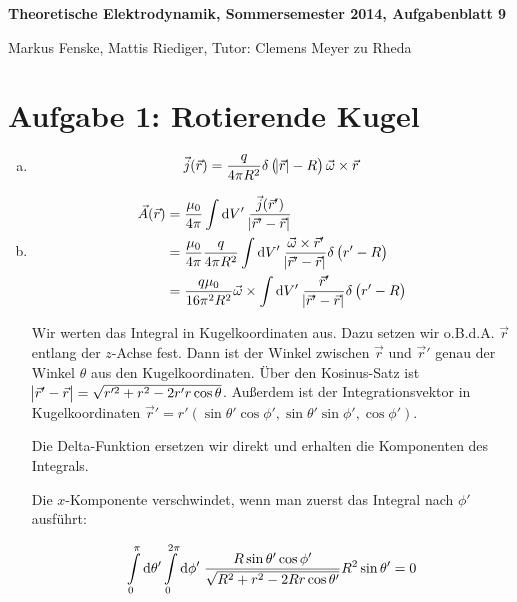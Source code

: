 \documentclass[a4paper,german,12pt,smallheadings]{scrartcl}
\begin{document}
\allowdisplaybreaks %
\begin{center}
\bfseries %
\sffamily %
\vspace{-40pt}
Theoretische Elektrodynamik, Sommersemester 2014, Aufgabenblatt 9

Markus Fenske, Mattis Riediger, Tutor: Clemens Meyer zu Rheda
\vspace{-10pt}
\end{center}

\section*{Aufgabe 1: Rotierende Kugel}
\begin{enumerate}[a)]
\item
\begin{equation}
  \vec{j}(\vec{r}) =  \frac{q}{4 \pi R^2} \delta\del{\envert{\vec{r}} - R} \vec{\omega} \times \vec{r}
\end{equation}
\item
  \begin{align}
    \vec{A}(\vec{r})
    &= \frac{\mu_0}{4 \pi} \int \dif V' \; \frac{\vec{j}(\vec{r}')}{\envert{\vec{r}' - \vec{r}}} \\
    &= \frac{\mu_0}{4 \pi} \frac{q}{4 \pi R^2} \int \dif V' \;
    \frac{\vec{\omega} \times \vec{r}'}{\envert{\vec{r}' - \vec{r}}}
    \delta\del{r' - R} \\
    &= \frac{q \mu_0}{16 \pi^2 R^2} \vec{\omega} \times \int \dif V' \;
    \frac{\vec{r}'}{\envert{\vec{r}' - \vec{r}}}
    \delta\del{r' - R} \\
  \end{align}

  Wir werten das Integral in Kugelkoordinaten aus. Dazu setzen wir o.B.d.A.
  $\vec{r}$ entlang der $z$-Achse fest.
  Dann ist der Winkel zwischen $\vec{r}$ und $\vec{r}'$ genau der Winkel
  $\theta$ aus den Kugelkoordinaten.  Über den Kosinus-Satz ist
  $\envert{\vec{r}' - \vec{r}} = \sqrt{r'^2 + r^2 - 2 r' r \cos \theta}$.
  Außerdem ist der Integrationsvektor in Kugelkoordinaten $\vec{r}' = r' (\sin
  \theta' \cos \phi', \sin \theta' \sin \phi', \cos \phi')$.

  Die Delta-Funktion ersetzen wir direkt und erhalten die Komponenten des
  Integrals.

  Die $x$-Komponente verschwindet, wenn man zuerst das Integral nach $\phi'$
  ausführt:

  \begin{align}
    \int\limits_0^\pi \dif \theta'
    \int\limits_0^{2 \pi} \dif \phi' \;
    \frac{R \sin \theta' \cos \phi'}{\sqrt{R^2 + r^2 - 2Rr \cos \theta'}} R^2 \sin \theta' = 0
  \end{align}


\end{enumerate}
\end{document}
